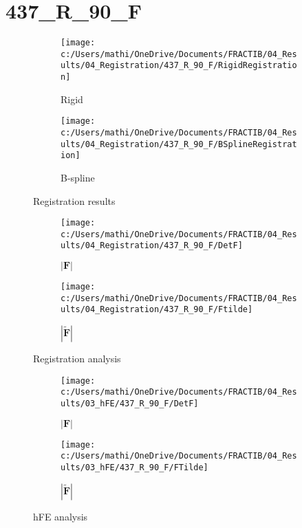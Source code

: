 \documentclass{article}%
\begin{document}
%
\newpage%
\section*{437\_R\_90\_F}%
\label{sec:437R90F}%


\begin{figure}[h!]%
\begin{subfigure}[b]{0.5\linewidth}%
\texttt{[image: c:/Users/mathi/OneDrive/Documents/FRACTIB/04\_Results/04\_Registration/437\_R\_90\_F/RigidRegistration]}%
\caption{Rigid}%
\end{subfigure}%
\begin{subfigure}[b]{0.5\linewidth}%
\texttt{[image: c:/Users/mathi/OneDrive/Documents/FRACTIB/04\_Results/04\_Registration/437\_R\_90\_F/BSplineRegistration]}%
\caption{B{-}spline}%
\end{subfigure}%
\caption{Registration results}%
\end{figure}

%


\begin{figure}[h!]%
\begin{subfigure}[b]{0.5\linewidth}%
\texttt{[image: c:/Users/mathi/OneDrive/Documents/FRACTIB/04\_Results/04\_Registration/437\_R\_90\_F/DetF]}%
\caption{$|\mathbf{F}|$}%
\end{subfigure}%
\begin{subfigure}[b]{0.5\linewidth}%
\texttt{[image: c:/Users/mathi/OneDrive/Documents/FRACTIB/04\_Results/04\_Registration/437\_R\_90\_F/Ftilde]}%
\caption{$|\widetilde{\mathbf{F}}|$}%
\end{subfigure}%
\caption{Registration analysis}%
\end{figure}

%


\begin{figure}[h!]%
\begin{subfigure}[b]{0.5\linewidth}%
\texttt{[image: c:/Users/mathi/OneDrive/Documents/FRACTIB/04\_Results/03\_hFE/437\_R\_90\_F/DetF]}%
\caption{$|\mathbf{F}|$}%
\end{subfigure}%
\begin{subfigure}[b]{0.5\linewidth}%
\texttt{[image: c:/Users/mathi/OneDrive/Documents/FRACTIB/04\_Results/03\_hFE/437\_R\_90\_F/FTilde]}%
\caption{$|\widetilde{\mathbf{F}}|$}%
\end{subfigure}%
\caption{hFE analysis}%
\end{figure}
\end{document}
